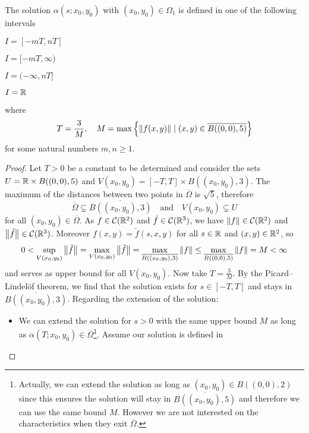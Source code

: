\begin{prop} \label{prop:characteristics_extension} The solution
	$\alpha(s;x_0,y_0)$ with $(x_0,y_0) \in \Omega_1$ is defined in one of the
	following intervals
	\begin{enumerateprop}
		\item $I = [-m T, n T]$
		\item $I = [-m T, \infty)$ \label{item:interval2}
		\item $I = (-\infty, n T]$
		\item $I = \mathbb{R}$ \label{item:interval4}
	\end{enumerateprop}
	where
	\[
		T = \frac{3}{M}, \quad 
		M = \max{\left\{ \norm{f(x,y)} \mid (x,y) \in \overline{B((0,0), 5)} \right\}}
	\]
	for some natural numbers $m, n \geq 1$.
\end{prop}
\begin{proof}
	Let $T > 0$ be a constant to be determined and consider the sets $U = \mathbb{R}
	\times B((0,0), 5)$ and $V(x_0,y_0) = [-T,T] \times \overline{B((x_0,y_0),
	3)}$. The maximum of the distances between two points in $\overline{\Omega}$
	is $\sqrt{5}$, therefore
	\[
		\overline{\Omega} \subsetneq \overline{B((x_0,y_0), 3)} 
		\quad
		\text{and}
		\quad
		V(x_0,y_0) \subsetneq U
	\]
	for all $(x_0,y_0) \in \overline{\Omega}$. As $f \in \mathcal{C}(\mathbb{R}^2)$
	and $\tilde{f} \in \mathcal{C}(\mathbb{R}^3)$, we have $\norm{f} \in
	\mathcal{C}(\mathbb{R}^2)$ and $\norm{\tilde{f}} \in \mathcal{C}(\mathbb{R}^3)$.
	Moreover $f(x,y) = \tilde{f}(s,x,y)$ for all $s \in \mathbb{R}$ and $(x,y) \in
	\mathbb{R}^2$, so
	\[
		0 < 
		\sup_{V(x_0,y_0)} \norm{\tilde{f}} =
		\max_{V(x_0,y_0)} \norm{\tilde{f}} =
		\max_{\overline{B((x_0,y_0),3)}} \norm{f} \leq
		\max_{\overline{B((0,0),5)}} \norm{f} = M < 
		\infty
	\]
	and serves as upper bound for all $V(x_0,y_0)$. Now take $T = \frac{3}{M}$.
	By the Picard--Lindelöf theorem, we find that the solution exists for $s \in
	[-T, T]$ and stays in $\overline{B((x_0,y_0), 3)}$. Regarding the extension
	of the solution:
	\begin{itemize}[topsep=0pt]
		\item We can extend the solution for $s > 0$ with the same upper bound
		$M$ as long as $\alpha(T; x_0, y_0) \in
		\overline{\Omega}$\footnote{Actually, we can extend the solution as long
		as $(x_0,y_0) \in \overline{B((0,0),2)}$ since this ensures the solution
		will stay in $\overline{B((x_0,y_0), 5)}$ and therefore we can use the
		same bound $M$. However we are not interested on the characteristics
		when they exit $\overline{\Omega}$.}. Assume our solution is defined in

\end{itemize}
\end{proof}
